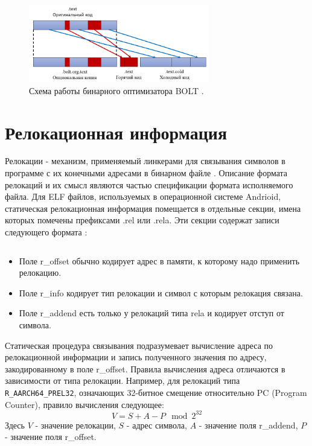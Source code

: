 \documentclass{mipt-thesis-bs}
\begin{document}
    \begin{figure}[h!]
        \centering
        \includegraphics[width=0.7\textwidth]{pics/BoltAlgorithmOverview.png}
        \caption{Схема работы бинарного оптимизатора BOLT \cite{lisitsyn-disser}.}
        \label{fig:boltoverview}
    \end{figure}


    \section{Релокационная информация}
    Релокации - механизм, применяемый линкерами для связывания символов в программе с их конечными адресами в бинарном файле \cite{linker-overview}. Описание формата релокаций и их смысл являются частью спецификации формата исполняемого файла. Для ELF файлов, используемых в операционной системе Andrioid, статическая релокационная информация помещается в отдельные секции, имена которых помечены префиксами .rel или .rela. Эти секции содержат записи следующего формата \cite{aarch64-elf-docs}:
    \inputminted{c}{src/relocations.c}

    \begin{itemize}
        \item Поле r\_offset обычно кодирует адрес в памяти, к которому надо применить релокацию.
        \item Поле r\_info кодирует тип релокации и символ с которым релокация связана.
        \item Поле r\_addend есть только у релокаций типа rela и кодирует отступ от символа.
    \end{itemize}

    Статическая процедура связывания подразумевает вычисление адреса по релокационной информации и запись полученного значения по адресу, закодированному в поле r\_offset. Правила вычисления адреса отличаются в зависимости от типа релокации. Например, для релокаций типа \verb|R_AARCH64_PREL32|, означающих 32-битное смещение относительно PC (Program Counter), правило вычисления следующее:
    \begin{equation}
        V = S + A - P \mod 2^{32}
        \label{eq:RelocValue}
    \end{equation}
    Здесь $V$ - значение релокации, $S$ - адрес символа, $A$ - значение поля r\_addend, $P$ - значение поля r\_offset.
\end{document}
